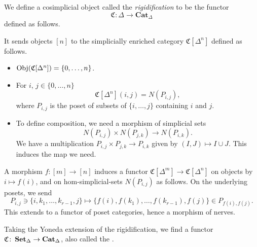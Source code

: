 \begin{definition}[Rigidification]
	\label{def:rigidification}
	We define a cosimplicial object called the \emph{rigidification} to be the functor
	\begin{equation*}
	\mathfrak{C}\colon \Delta \to \mathbf{Cat}_{\Delta}
	\end{equation*}
	defined as follows.
	
	It sends objects $[n]$ to the simplicially enriched category $\mathfrak{C}[\Delta^{n}]$ defined as follows.
	\begin{itemize}
		\item $\operatorname{Obj}(\mathfrak{C}[\Delta^{n}]) = \{0, \ldots, n\}$.
		
		\item For $i$, $j \in \{0, \ldots, n\}$
		\begin{equation*}
		\mathfrak{C}[\Delta^{n}](i, j) = N(P_{i, j}),
		\end{equation*}
		where $P_{i, j}$ is the poset of subsets of $\{i, \ldots, j\}$ containing $i$ and $j$.
		
		\item To define composition, we need a morphism of simplicial sets
		\begin{equation*}
		N(P_{i,j}) \times N(P_{j,k}) \to N(P_{i, k}).
		\end{equation*}
		We have a multiplication $P_{i,j} \times P_{j, k} \to P_{i, k}$ given by $(I, J) \mapsto I \cup J$. This induces the map we need.
	\end{itemize}
	
	A morphism $f\colon [m] \to [n]$ induces a functor $\mathfrak{C}[\Delta^{m}] \to \mathfrak{C}[\Delta^{n}]$ on objects by $i \mapsto f(i)$, and on hom-simplicial-sets $N(P_{i,j})$ as follows. On the underlying posets, we send
	\begin{equation*}
	P_{i,j} \ni \{ i, k_{1}, \ldots, k_{r-1}, j \} \mapsto \{f(i), f(k_{1}), \ldots, f(k_{r-1}), f(j)\} \in P_{f(i),f(j)}.
	\end{equation*}
	This extends to a functor of poset categories, hence a morphism of nerves.
	
	Taking the Yoneda extension of the rigidification, we find a functor $\mathfrak{C}\colon \operatorname{\mathbf{Set}_{\Delta}} \to \operatorname{\mathbf{Cat}_{\Delta}}$, also called the .
\end{definition}

